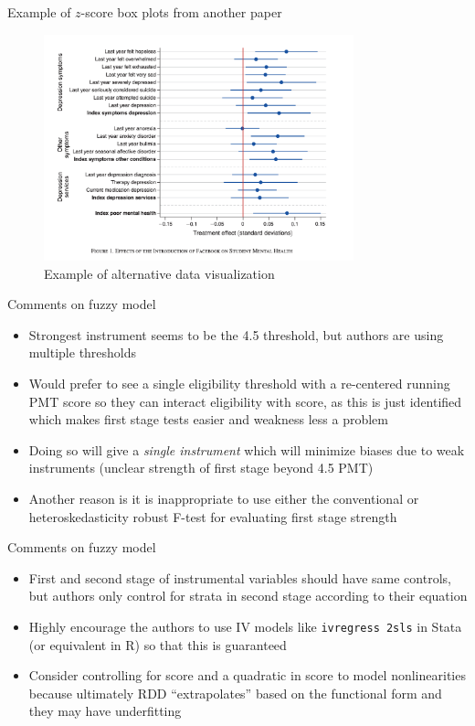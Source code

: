 \documentclass{beamer}
\begin{document}
\begin{frame}{Example of $z$-score box plots from another paper}
    \begin{figure}
        \centering
        \includegraphics[width=0.8\textwidth]{./lecture_includes/facebook_2.png}
        \caption{Example of alternative data visualization}
    \end{figure}
\end{frame}


\begin{frame}{Comments on fuzzy model}

\begin{itemize}
\item Strongest instrument seems to be the 4.5 threshold, but authors are using multiple thresholds
\item Would prefer to see a single eligibility threshold with a re-centered running PMT score so they can interact eligibility with score, as this is just identified which makes first stage tests easier and weakness less a problem
\item Doing so will give a \emph{single instrument} which will minimize biases due to weak instruments (unclear strength of first stage beyond 4.5 PMT)
\item Another reason is it is inappropriate to use either the conventional or heteroskedasticity robust F-test for evaluating first stage strength 
\end{itemize}

\end{frame}

\begin{frame}{Comments on fuzzy model}

\begin{itemize}
\item First and second stage of instrumental variables should have same controls, but authors only control for strata in second stage according to their equation
\item Highly encourage the authors to use IV models like \texttt{ivregress 2sls} in Stata (or equivalent in R) so that this is guaranteed
\item Consider controlling for score and a quadratic in score to model nonlinearities because ultimately RDD ``extrapolates'' based on the functional form and they may have underfitting
\end{itemize}

\end{frame}
\end{document}
